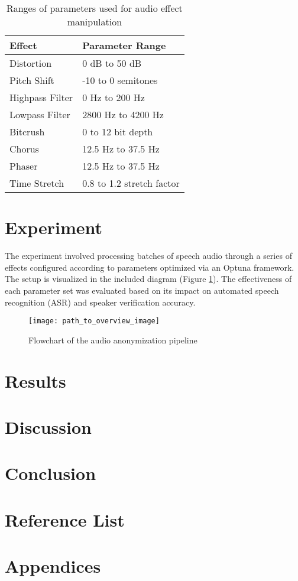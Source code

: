 \documentclass{article}
\begin{document}
    \begin{table}[h]
        \centering
        \begin{tabular}{ll}
            \toprule
            \textbf{Effect} & \textbf{Parameter Range} \\
            \midrule
            Distortion & 0 dB to 50 dB \\
            Pitch Shift & -10 to 0 semitones \\
            Highpass Filter & 0 Hz to 200 Hz \\
            Lowpass Filter & 2800 Hz to 4200 Hz \\
            Bitcrush & 0 to 12 bit depth \\
            Chorus & 12.5 Hz to 37.5 Hz \\
            Phaser & 12.5 Hz to 37.5 Hz \\
            Time Stretch & 0.8 to 1.2 stretch factor \\
            \bottomrule
        \end{tabular}
        \caption{Ranges of parameters used for audio effect manipulation}
        \label{tab:parameters}
    \end{table}

\section{Experiment}
    The experiment involved processing batches of speech audio through a series of effects configured according to parameters optimized via an Optuna framework. The setup is visualized in the included diagram (Figure \ref{fig:overview}). The effectiveness of each parameter set was evaluated based on its impact on automated speech recognition (ASR) and speaker verification accuracy.

    \begin{figure}[h]
        \centering
        \texttt{[image: path\_to\_overview\_image]}
        \caption{Flowchart of the audio anonymization pipeline}
        \label{fig:overview}
    \end{figure}

\section{Results}

\section{Discussion}

\section{Conclusion}

\section{Reference List}

\section{Appendices}
\end{document}
